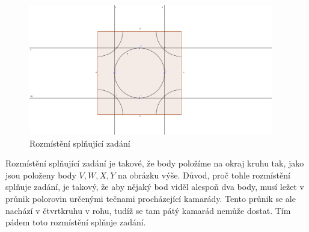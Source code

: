 \documentclass{fkssolpub}
\author{Ondřej Sedláček}
\begin{document}
\begin{figure}[h!]
	\centering
	\includegraphics[width=0.95\textwidth]{2-fig.png}
	\caption{Rozmístění splňující zadání}
	\label{fig:sol}
\end{figure}

Rozmístění splňující zadání je takové, že body položíme na okraj kruhu tak,
jako jsou položeny body $V, W, X, Y$ na obrázku výše. Důvod, proč tohle rozmístění
splňuje zadání, je takový, že aby nějaký bod viděl alespoň dva body, musí ležet
v průnik polorovin určenými tečnami procházející kamarády. Tento průnik se ale
nachází v čtvrtkruhu v rohu, tudíž se tam pátý kamarád nemůže dostat. Tím pádem
toto rozmístění splňuje zadání.
\end{document}
